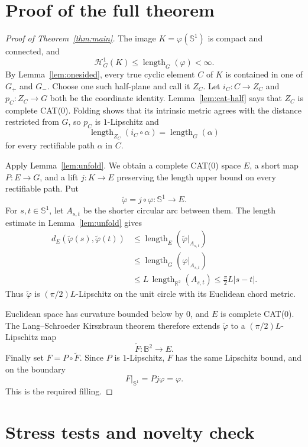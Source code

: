 \documentclass[11pt]{article}
\newcommand{\R}{\mathbb R}
\newcommand{\Sph}{\mathbb S}
\newcommand{\B}{\mathbb B}
\newcommand{\Hh}{\mathcal H}
\newcommand{\len}{\operatorname{length}}
\begin{document}
\section{Proof of the full theorem}

\begin{proof}[Proof of Theorem~\ref{thm:main}]
The image $K=\varphi(\Sph^1)$ is compact and connected, and
\[
 \Hh^1_G(K)\le \len_G(\varphi)<\infty.
\]
By Lemma~\ref{lem:onesided}, every true cyclic element $C$ of $K$ is
contained in one of $G_+$ and $G_-$.  Choose one such half-plane and call it
$Z_C$.  Let $i_C:C\to Z_C$ and $p_C:Z_C\to G$ both be the coordinate
identity.  Lemma~\ref{lem:cat-half} says that $Z_C$ is complete CAT(0).
Folding shows that its intrinsic metric agrees with the distance restricted
from $G$, so $p_C$ is $1$-Lipschitz and
\[
 \len_{Z_C}(i_C\circ\alpha)=\len_G(\alpha)
\]
for every rectifiable path $\alpha$ in $C$.

Apply Lemma~\ref{lem:unfold}.  We obtain a complete CAT(0) space $E$, a short
map $P:E\to G$, and a lift $j:K\to E$ preserving the length upper bound on
every rectifiable path.  Put
\[
 \widetilde\varphi=j\circ\varphi:\Sph^1\to E.
\]
For $s,t\in\Sph^1$, let $A_{s,t}$ be the shorter circular arc between them.
The length estimate in Lemma~\ref{lem:unfold} gives
\[
\begin{split}
 d_E(\widetilde\varphi(s),\widetilde\varphi(t))
 &\le \len_E(\widetilde\varphi|_{A_{s,t}})\\
 &\le \len_G(\varphi|_{A_{s,t}})\\
 &\le L\,\len_{\R^2}(A_{s,t})
 \le \frac\pi2 L|s-t|.
\end{split}
\]
Thus $\widetilde\varphi$ is $(\pi/2)L$-Lipschitz on the unit circle with its
Euclidean chord metric.

Euclidean space has curvature bounded below by $0$, and $E$ is complete
CAT(0).  The Lang--Schroeder Kirszbraun theorem therefore extends
$\widetilde\varphi$ to a $(\pi/2)L$-Lipschitz map
\[
 \widetilde F:\B^2\to E.
\]
Finally set $F=P\circ\widetilde F$.  Since $P$ is $1$-Lipschitz,
$F$ has the same Lipschitz bound, and on the boundary
\[
 F|_{\Sph^1}=Pj\varphi=\varphi.
\]
This is the required filling.
\end{proof}

\section{Stress tests and novelty check}
\end{document}

